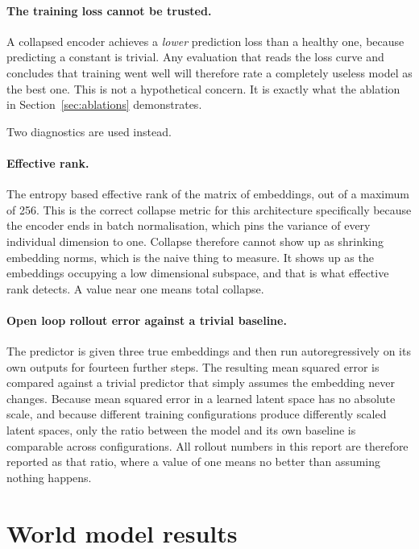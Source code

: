 \documentclass[11pt,a4paper]{article}
\begin{document}
\paragraph{The training loss cannot be trusted.} A collapsed encoder achieves a
\emph{lower} prediction loss than a healthy one, because predicting a constant is
trivial. Any evaluation that reads the loss curve and concludes that training went
well will therefore rate a completely useless model as the best one. This is not a
hypothetical concern. It is exactly what the ablation in
Section~\ref{sec:ablations} demonstrates.

Two diagnostics are used instead.

\paragraph{Effective rank.} The entropy based effective rank of the matrix of
embeddings, out of a maximum of 256. This is the correct collapse metric for this
architecture specifically because the encoder ends in batch normalisation, which
pins the variance of every individual dimension to one. Collapse therefore cannot
show up as shrinking embedding norms, which is the naive thing to measure. It shows
up as the embeddings occupying a low dimensional subspace, and that is what
effective rank detects. A value near one means total collapse.

\paragraph{Open loop rollout error against a trivial baseline.} The predictor is
given three true embeddings and then run autoregressively on its own outputs for
fourteen further steps. The resulting mean squared error is compared against a
trivial predictor that simply assumes the embedding never changes. Because mean
squared error in a learned latent space has no absolute scale, and because
different training configurations produce differently scaled latent spaces, only
the ratio between the model and its own baseline is comparable across
configurations. All rollout numbers in this report are therefore reported as that
ratio, where a value of one means no better than assuming nothing happens.

\section{World model results}
\end{document}
